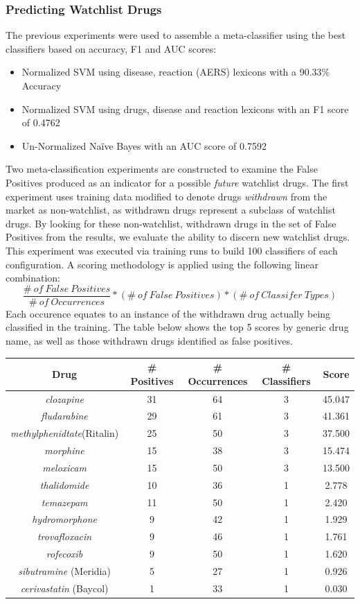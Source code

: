 \documentclass[twoside,11pt]{article}
\begin{document}
\subsubsection{Predicting Watchlist Drugs}
The previous experiments were used to assemble a meta-classifier using the best classifiers based on accuracy, F1 and AUC scores:
\begin{itemize}
  \item Normalized SVM using disease, reaction (AERS) lexicons with a 90.33\% Accuracy
  \item Normalized SVM using drugs, disease and reaction lexicons with an F1 score of 0.4762
  \item Un-Normalized Na\"ive Bayes with an AUC score of 0.7592
\end{itemize}
Two meta-classification experiments are constructed to examine the False Positives produced as an indicator for a possible \textit{future} watchlist drugs. The first experiment uses training data modified to denote drugs \textit{withdrawn} from the market as non-watchlist, as withdrawn drugs represent a subclass of watchlist drugs. By looking for these non-watchlist, withdrawn drugs in the set of False Positives from the results, we evaluate the ability to discern new watchlist drugs. This experiment was executed via training runs to build 100 classifiers of each configuration. A scoring methodology is applied using the following linear combination:
\[
  \frac{\#\ of\ False\ Positives}{\#\ of\ Occurrences} * (\#\ of\ False\ Positives) * (\#\ of\ Classifer\ Types)
\]
Each occurence equates to an instance of the withdrawn drug actually being classified in the training. The table below shows the top 5 scores by generic drug name, as well as those withdrawn drugs identified as false positives.
\begin{center}
  \begin{tabular}{||c c c c c||}
    \hline
    Drug & # Positives & # Occurrences & # Classifiers & Score \\
    \hline\hline
    \textit{clozapine} & 31 & 64 & 3 & 45.047 \\
    \hline
    \textit{fludarabine} & 29 & 61 & 3 & 41.361 \\
    \hline
    \textit{methylphenidtate}(Ritalin) & 25 & 50 & 3 & 37.500 \\
    \hline
    \textit{morphine} & 15 & 38 & 3 & 15.474 \\
    \hline
    \textit{meloxicam} & 15 & 50 & 3 & 13.500 \\
    \hline\hline
    \textit{thalidomide} & 10 & 36 & 1 & 2.778 \\
    \textit{temazepam} & 11 & 50 & 1 & 2.420 \\
    \textit{hydromorphone} & 9 & 42 & 1 & 1.929 \\
    \textit{trovafloxacin} & 9 & 46 & 1 & 1.761 \\
    \textit{rofecoxib} & 9 & 50 & 1 & 1.620 \\
    \textit{sibutramine} (Meridia) & 5 & 27 & 1 & 0.926 \\
    \textit{cerivastatin} (Baycol) & 1 & 33 & 1 & 0.030 \\
    \hline
  \end{tabular}
\end{center}
\end{document}
